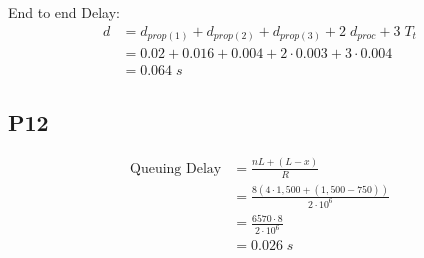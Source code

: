 \documentclass[journal]{IEEEtran}
\begin{document}
End to end Delay:
\begin{equation*}
  \begin{split}
  d & = d_{prop(1)} + d_{prop(2)} + d_{prop(3)} + 2 \; d_{proc} + 3 \; T_t \\
  & = 0.02 + 0.016 + 0.004 + 2 \cdot 0.003 + 3 \cdot 0.004 \\
  & = 0.064 \; s
  \end{split}
\end{equation*}

\subsection*{P12}

\begin{equation*}
  \begin{split}
  \text{Queuing Delay} & = \frac{nL + (L - x)}{R} \\
  & = \frac{8(4 \cdot 1,500 + (1,500 - 750))}{2 \cdot 10^6} \\
  & = \frac{6570 \cdot 8}{2 \cdot 10^6} \\
  & = 0.026 \; s
  \end{split}
\end{equation*}
\end{document}
